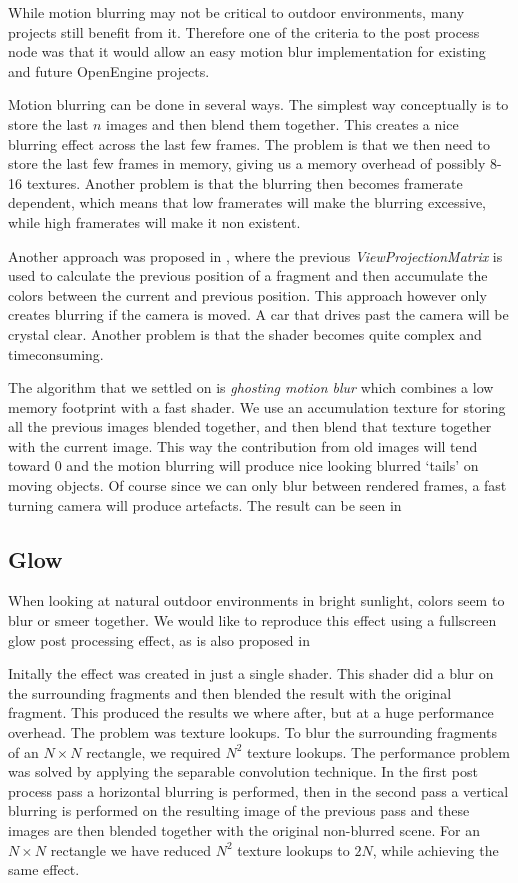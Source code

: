 While motion blurring may not be critical to outdoor environments,
many projects still benefit from it. Therefore one of the criteria
to the post process node was that it would allow an easy motion blur
implementation for existing and future OpenEngine projects.

Motion blurring can be done in several ways. The simplest way
conceptually is to store the last $n$ images and then blend them
together. This creates a nice blurring effect across the last few
frames. The problem is that we then need to store the last few frames
in memory, giving us a memory overhead of possibly 8-16
textures. Another problem is that the blurring then becomes framerate
dependent, which means that low framerates will make the blurring
excessive, while high framerates will make it non existent.

Another approach was proposed in , where
the previous \emph{ViewProjectionMatrix} is used to calculate the
previous position of a fragment and then accumulate the colors between
the current and previous position. This approach however only creates
blurring if the camera is moved. A car that drives past the camera
will be crystal clear. Another problem is that the shader becomes
quite complex and timeconsuming.

The algorithm that we settled on is \emph{ghosting motion blur} which
combines a low memory footprint with a fast shader. We use an
accumulation texture for storing all the previous images blended
together, and then blend that texture together with the current
image. This way the contribution from old images will tend toward 0
and the motion blurring will produce nice looking blurred `tails' on
moving objects. Of course since we can only blur between rendered
frames, a fast turning camera will produce artefacts. The result can
be seen in 

\subsection{Glow}

When looking at natural outdoor environments in bright sunlight,
colors seem to blur or smeer together. We would like to reproduce this
effect using a fullscreen glow post processing effect, as is also
proposed in 

Initally the effect was created in just a single shader. This shader
did a blur on the surrounding fragments and then blended the result
with the original fragment. This produced the results we where after,
but at a huge performance overhead. The problem was texture
lookups. To blur the surrounding fragments of an $N \times N$
rectangle, we required $N^2$ texture lookups. The performance problem
was solved by applying the separable convolution technique. In the
first post process pass a horizontal blurring is performed, then in
the second pass a vertical blurring is performed on the resulting
image of the previous pass and these images are then blended together
with the original non-blurred scene. For an $N \times N$ rectangle we
have reduced $N^2$ texture lookups to $2N$, while achieving the same
effect.

